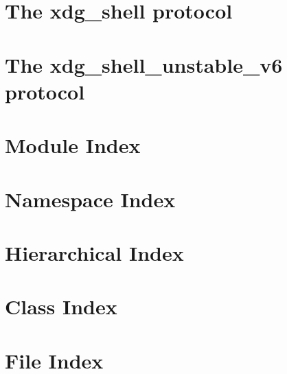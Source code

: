 \let\mypdfximage\pdfximage\def\pdfximage{\immediate\mypdfximage}\documentclass[twoside]{book}
\newcommand{\+}{\discretionary{\mbox{\scriptsize$\hookleftarrow$}}{}{}}
\begin{document}
\chapter{The xdg\+\_\+shell protocol}
\label{page_xdg_shell}

\chapter{The xdg\+\_\+shell\+\_\+unstable\+\_\+v6 protocol}
\label{page_xdg_shell_unstable_v6}

\chapter{Module Index}

\chapter{Namespace Index}

\chapter{Hierarchical Index}

\chapter{Class Index}

\chapter{File Index}

\end{document}
